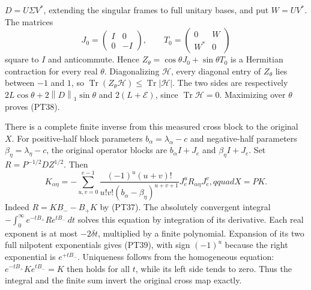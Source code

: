 \documentclass[11pt]{article}
\newcommand{\norm}[1]{\left\lVert#1\right\rVert}
\DeclareMathOperator{\Tr}{Tr}
\begin{document}
\(D=U\Sigma V^*\), extending the singular frames to full unitary
bases, and put \(W=UV^*\). The matrices
\[
 J_0=\begin{pmatrix}I&0\\0&-I\end{pmatrix},\qquad
 T_0=\begin{pmatrix}0&W\\W^*&0\end{pmatrix}
\]
square to \(I\) and anticommute. Hence
\(Z_\theta=\cos\theta J_0+\sin\theta T_0\) is a Hermitian
contraction for every real \(\theta\). Diagonalizing
\(\mathcal H\), every diagonal entry of \(Z_\theta\) lies
between \(-1\) and \(1\), so
\(\Tr(Z_\theta\mathcal H)\le\Tr|\mathcal H|\).
The two sides are respectively
\(2L\cos\theta+2\norm D_1\sin\theta\) and
\(2(L+\mathcal E)\), since \(\Tr\mathcal H=0\).
Maximizing over \(\theta\) proves (PT38).

There is a complete finite inverse from this measured cross block
to the original \(X\). For positive-half block parameters
\(b_\alpha=\lambda_\alpha-c\) and negative-half parameters
\(\beta_\eta=\lambda_\eta-c\), the original operator blocks
are \(b_\alpha I+J_e\) and \(\beta_\eta I+J_e\).
Set \(R=P^{-1/2}DZ^{1/2}\). Then
\begin{equation}\tag{PT39}
 K_{\alpha\eta}
 =-\sum_{u,v=0}^{e-1}
 \frac{(-1)^u(u+v)!}
      {u!v!(b_\alpha-\beta_\eta)^{u+v+1}}
 J_e^uR_{\alpha\eta}J_e^v,qquad X=PK.
\end{equation}
Indeed \(R=KB_--B_+K\) by (PT37). The absolutely convergent
integral \(-\int_0^\infty e^{-tB_+}Re^{tB_-}\,dt\) solves
this equation by integration of its derivative. Each real
exponent is at most \(-2\delta t\), multiplied by a finite
polynomial. Expansion of its two full nilpotent exponentials
gives (PT39), with sign \((-1)^u\) because the right exponential
is \(e^{+tB_-}\). Uniqueness follows from the homogeneous
equation: \(e^{-tB_+}Ke^{tB_-}=K\) then holds for all \(t\),
while its left side tends to zero. Thus the integral and the
finite sum invert the original cross map exactly.
\end{document}
